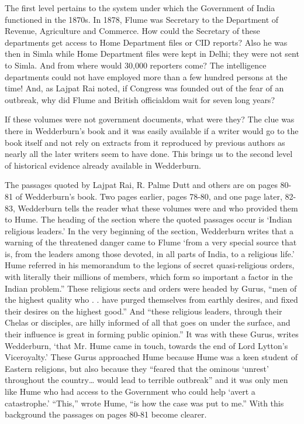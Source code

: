 The first level pertains to the system under which the Government of India functioned in the 1870s. In 1878, Flume was Secretary to the Department of Revenue, Agriculture and Commerce. How could the Secretary of these departments get access to Home Department files or CID reports? Also he was then in Simla while Home Department files were kept in Delhi; they were not sent to Simla. And from where would 30,000 reporters come? The intelligence departments could not have employed more than a few hundred persons at the time! And, as Lajpat Rai noted, if Congress was founded out of the fear of an outbreak, why did Flume and British officialdom wait for seven long years?

If these volumes were not government documents, what were they? The clue was there in Wedderburn's book and it was easily available if a writer would go to the book itself and not rely on extracts from it reproduced by previous authors as nearly all the later writers seem to have done. This brings us to the second level of historical evidence already available in Wedderburn.

The passages quoted by Lajpat Rai, R. Palme Dutt and others are on pages 80-81 of Wedderburn's book. Two pages earlier, pages 78-80, and one page later, 82-83, Wedderburn tells the reader what these volumes were and who provided them to Hume. The heading of the section where the quoted passages occur is `Indian religious leaders.' In the very beginning of the section, Wedderburn writes that a warning of the threatened danger came to Flume `from a very special source that is, from the leaders among those devoted, in all parts of India, to a religious life.' Hume referred in his memorandum to the legions of secret quasi-religious orders, with literally their millions of members, which form so important a factor in the Indian problem.'' These religious sects and orders were headed by Gurus, ``men of the highest quality who . . have purged themselves from earthly desires, and fixed their desires on the highest good.'' And ``these religious leaders, through their Chelas or disciples, are hilly informed of all that goes on under the surface, and their influence is great in forming public opinion.'' It was with these Gurus, writes Wedderburn, `that Mr. Hume came in touch, towards the end of Lord Lytton's Viceroyalty.' These Gurus approached Hume because Hume was a keen student of Eastern religions, but also because they ``feared that the ominous `unrest' throughout the country… would lead to terrible outbreak'' and it was only men like Hume who had access to the Government who could help `avert a catastrophe.' ``This,'' wrote Hume, ``is how the case was put to me.'' With this background the passages on pages 80-81 become clearer.

